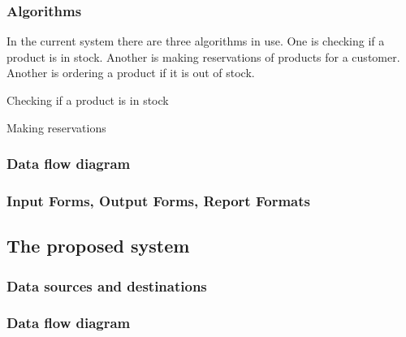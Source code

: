 \subsubsection{Algorithms}
In the current system there are three algorithms in use. One is checking if a product is in stock. Another is making reservations of products for a customer. Another is ordering a product if it is out of stock.


\begin{algorithm}[H]
\label{fig:repeat_as_while_pseudo_example_2}
    \caption{Checking if a product is in stock}
\begin{algorithmic}[1]
\State
{}
    \EndIf
\EndWhile
\end{algorithmic}
\end{algorithm}


\begin{algorithm}[H]
\label{fig:repeat_as_while_pseudo_example_2}
    \caption{Making reservations}
\begin{algorithmic}[1]
\State
{}
    \EndIf
\EndWhile
\end{algorithmic}
\end{algorithm}

\subsubsection{Data flow diagram}

\subsubsection{Input Forms, Output Forms, Report Formats}

\subsection{The proposed system}

\subsubsection{Data sources and destinations}

\subsubsection{Data flow diagram}

